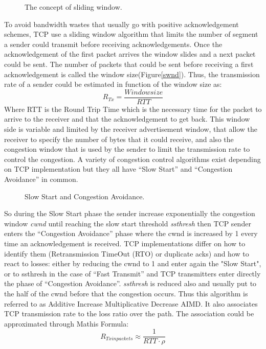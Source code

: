  \begin{figure}[h]
  \begin{center}
\caption{
  The concept of sliding window.
    \label{fig:swnd}
}
 \end{center}
\end{figure}

To avoid bandwidth wastes that usually go with positive acknowledgement schemes, TCP use a sliding window algorithm that limits the number of segment a sender could transmit before receiving acknowledgements. Once the acknowledgement of the first packet arrives the window slides and a next packet could be sent. The number of packets that could be sent before receiving a first acknowledgement is called the window size(Figure\ref{swnd}). Thus, the transmission rate of a sender could be estimated in function of the window size as:
\begin{equation}
R_{Tx} = \frac{Window size}{RTT}
\end{equation}
Where RTT is the Round Trip Time which is the necessary time for the packet to arrive to the receiver and that the acknowledgement to get back. This window side is variable and limited by the receiver advertisement window, that allow the receiver to specify the number of bytes that it could receive, and also the congestion window that is used by the sender to limit the transmission rate to control the congestion. A variety of congestion control algorithms exist depending on TCP implementation but they all have “Slow Start” and “Congestion Avoidance” in common. 

 \begin{figure}[h]
  \begin{center}
\caption{
  Slow Start and Congestion Avoidance.
    \label{fig:SSCA}
}
 \end{center}
\end{figure}

So during the Slow Start phase the sender increase exponentially the congestion window {\it cwnd} until reaching the slow start threshold {\it ssthresh} then TCP sender enters the “Congestion Avoidance” phase where the cwnd is increased by 1 every time an acknowledgement is received.
TCP implementations differ on how to identify them (Retransmission TimeOut (RTO) or duplicate acks) and how to react to losses: either by reducing the cwnd to 1 and enter again the "Slow Start", or to ssthresh in the case of “Fast Transmit” and TCP transmitters enter directly the phase of  “Congestion Avoidance”. {\it ssthresh} is reduced also and usually put to the half of the cwnd before that the congestion occurs. Thus this algorithm is referred to as Additive Increase Multiplicative Decrease AIMD. It also associates TCP transmission rate to the loss ratio over the path. The association could be approximated through Mathis Formula:
\begin{equation}
R_{Tx in packets} \approx \frac{1}{RTT \cdot \rho}
\end{equation}

